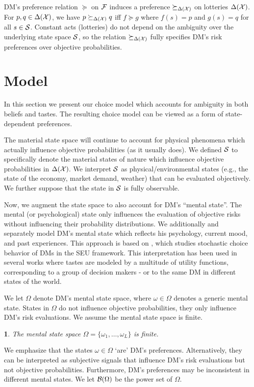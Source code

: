 \documentclass[11pt,oneside]{article}
\theoremstyle{plain}
\theoremstyle{plain}
\theoremstyle{plain}
\theoremstyle{plain}
\theoremstyle{plain}
\newtheorem{assumption}[thm]{\protect\assumptionname}
\theoremstyle{definition}
\theoremstyle{definition}
\theoremstyle{remark}
\theoremstyle{plain}
\providecommand{\assumptionname}{Assumption}
\newcommand{\mcs}{{\cal S}}
\newcommand{\mcx}{{\cal X}}
\begin{document}
DM's preference relation $\succeq$ on ${\cal F}$ induces a preference $\succeq_{\Delta(\mcx)}$ on lotteries $\Delta(\mcx)$.
For $p, q \in \Delta(\mcx)$, we have $p \succeq_{\Delta(\mcx)} q$ iff $f \succeq g$ where $f(s) = p$ and $g(s) = q$ for all $s \in \mcs$.
Constant acts (lotteries) do not depend on the ambiguity over the underlying state space $\mcs$, so the relation $\succeq_{\Delta(\mcx)}$ fully specifies DM's risk preferences over objective probabilities.


\section{Model}
\label{sec:model}

In this section we present our choice model which accounts for ambiguity in both beliefs and tastes. The resulting choice model can be viewed as a form of state-dependent preferences.

The material state space will continue to account for physical phenomena which actually influence objective probabilities (as it usually does). 
We defined $\mcs$ to specifically denote the material states of nature which influence objective probabilities in $\Delta(\mcx)$.
We interpret $\mcs$ as physical/environmental states (e.g., the state of the economy, market demand, weather) that can be evaluated objectively.
We further suppose that the state in $\mcs$ is fully observable.

Now, we augment the state space to also account for DM's ``mental state''. The mental (or psychological) state only influences the evaluation of objective risks without influencing their probability distributions.
We additionally and separately model DM's mental state which reflects his psychology, current mood, and past experiences.
This approach is based on \cite{karni2016theory}, which studies stochastic choice behavior of DMs in the SEU framework.
This interpretation has been used in several works where tastes are modeled by a multitude of utility functions, corresponding to a group of decision makers - or to the same DM in different states of the world.

We let $\Omega$ denote DM's mental state space, where $\omega \in \Omega$ denotes a generic mental state.
States in $\Omega$ do not influence objective probabilities, they only influence DM's risk evaluations.
We assume the mental state space is finite.

\begin{assumption}
    \label{assumption:mental_state}
    The mental state space $\Omega = \{\omega_1,\ldots,\omega_L\}$ is finite.
\end{assumption}
\noindent
We emphasize that the states $\omega \in \Omega$ `are' DM's preferences.
Alternatively, they can be interpreted as subjective signals that influence DM's risk evaluations but not objective probabilities.
Furthermore, DM's preferences may be inconsistent in different mental states.
We let ${\cal B}(\Omega)$ be the power set of $\Omega$.
\end{document}
